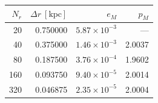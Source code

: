 \begin{tabular}{rrrr}\toprule
$N_r$ & $\Delta r\ [\mathrm{kpc}]$ & $e_M$ & $p_M$ \\
\midrule
20 & 0.750000 & $5.87\times 10^{-3}$ & --- \\
40 & 0.375000 & $1.46\times 10^{-3}$ & 2.0037 \\
80 & 0.187500 & $3.76\times 10^{-4}$ & 1.9602 \\
160 & 0.093750 & $9.40\times 10^{-5}$ & 2.0014 \\
320 & 0.046875 & $2.35\times 10^{-5}$ & 2.0004 \\
\bottomrule\end{tabular}
